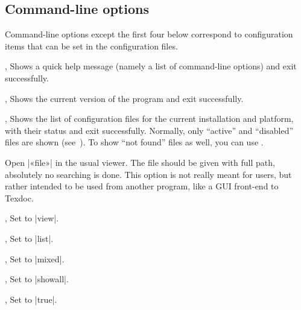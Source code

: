 \documentclass[draft]{texdoc-doc}
\begin{document}
\subsection{Command-line options}
\label{sec:cl}

Command-line options except the first four below correspond to configuration
items that can be set in the configuration files.

\begin{clopt}{, }
Shows a quick help message (namely a list of command-line options) and exit
successfully.
\end{clopt}

\begin{clopt}{, }
Shows the current version of the program and exit successfully.
\end{clopt}

\begin{clopt}{, }
Shows the list of configuration files for the current installation and
platform, with their status and exit successfully. Normally, only ``active''
and ``disabled'' files are shown (see~). To show ``not
found'' files as well, you can use .
\end{clopt}

\begin{clopt}{}
Open |«file»| in the usual viewer. The file should be given with full path,
absolutely no searching is done. This option is not really meant for users,
but rather intended to be used from another program, like a GUI front-end to
Texdoc.
\end{clopt}

\begin{clopt}{, }
Set  to |view|.
\end{clopt}

\begin{clopt}{, }
Set  to |list|.
\end{clopt}

\begin{clopt}{, }
Set  to |mixed|.
\end{clopt}

\begin{clopt}{, }
Set  to |showall|.
\end{clopt}

\begin{clopt}{, }
Set  to |true|.
\end{clopt}
\end{document}
